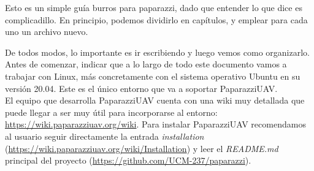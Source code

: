 Esto es un simple guía burros para paparazzi, dado que entender lo que dice es complicadillo.
En principio, podemos dividirlo en capítulos, y emplear para cada uno un archivo nuevo.

De todos modos, lo importante es ir escribiendo y luego vemos como organizarlo. \\

Antes de comenzar, indicar que a lo largo de todo este documento vamos a trabajar con Linux, más concretamente con el sistema operativo Ubuntu en su versión 20.04. Este es el único entorno que va a soportar PaparazziUAV.\\

\noindent El equipo que desarrolla PaparazziUAV cuenta con una wiki muy detallada que puede llegar a ser muy útil para incorporarse al entorno: \url{https://wiki.paparazziuav.org/wiki}. Para instalar PaparazziUAV recomendamos al usuario seguir directamente la entrada \textit{installation} (\url{https://wiki.paparazziuav.org/wiki/Installation}) y leer el \textit{README.md} principal del proyecto (\url{https://github.com/UCM-237/paparazzi}). \\